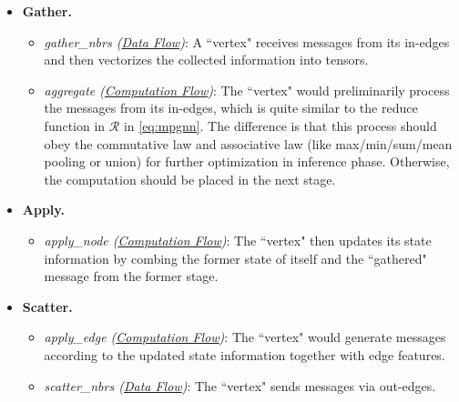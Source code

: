 \documentclass[conference]{IEEEtran}
\begin{document}
\begin{itemize}
\item \textbf{Gather.}
	\begin{itemize}
	\item \emph{gather\_nbrs (\underline{Data Flow})}:
	A ``vertex" receives messages from its in-edges and then vectorizes the collected information into tensors. 
	\item \emph{aggregate (\underline{Computation Flow})}: 
	The ``vertex" would preliminarily process the messages from its in-edges, which is quite similar to the reduce function in $\mathcal{R}$ in \eqref{eq:mpgnn}.
	The difference is that this process should obey the commutative law and associative law (like max/min/sum/mean pooling or union) for further optimization in inference phase.
	Otherwise, the computation should be placed in the next stage.
	\end{itemize}
\item \textbf{Apply.}
\begin{itemize}
\item \emph{apply\_node (\underline{Computation Flow})}: The ``vertex" then updates its state information by combing the former state of itself and the ``gathered"  message from the former stage.
\end{itemize}
\item \textbf{Scatter.}
	\begin{itemize}
	\item \emph{apply\_edge (\underline{Computation Flow})}:
	The ``vertex" would generate messages according to the updated state information together with edge features.
	\item \emph{scatter\_nbrs (\underline{Data Flow})}:
	The ``vertex" sends messages via out-edges.
	\end{itemize}
\end{itemize}
\end{document}
